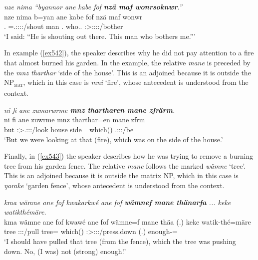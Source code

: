 \begin{exe}
	\ex \emph{nze nima ``byannor ane kabe fof \textbf{nzä maf wonrsoknwr}.''}\\
	\gll nze nima b=yan ane kabe fof nzä maf wonwr\\
	\Fsg.{\Erg} {\Quot} \Med=\Tsg.\Masc:\Sbj:\Nonpast:\Ipfv:\Venit/shout {\Dem} man {\Emph} \Fsg.{\Abs} who.\Sg.{\Erg} \Stsg:\Sbj>\Fsg:\Obj:\Nonpast:\Ipfv:\Venit/bother\\
	\trans `I said: ``He is shouting out there. This man who bothers me.'''\\
	\label{ex541}
\end{exe}

In example (\ref{ex542}), the speaker describes why he did not pay attention to a fire that almost burned his garden. In the example, the relative  \emph{mane} is preceded by the  \emph{mnz tharthar} `side of the house'. This is an adjoined  because it is outside the NP\textsubscript{\textsc{mat}}, which in this case is \emph{mni} `fire', whose antecedent is understood from the context.

\begin{exe}
	\ex \emph{ni fi ane zumarwrme \textbf{mnz thartharen mane zfrärm}.}\\
	\gll ni fi ane zuwrme mnz tharthar=en mane zfrm\\
	{\Fnsg} but {\Dem} \Fpl:\Sbj>\Tsg.\F:\Obj:\Pst:\Dur/look house side={\Loc} which(\Abs) \Tsg.\F:\Sbj:\Pst:\Dur/be\\
	\trans `But we were looking at that (fire), which was on the side of the house.'\\
	\label{ex542}
\end{exe}

Finally, in (\ref{ex543}) the speaker describes how he was trying to remove a burning tree from his garden fence. The relative  \emph{mane} follows the  marked \emph{wämne} `tree'. This is an adjoined  because it is outside the matrix NP, which in this case is \emph{ŋarake} `garden fence', whose antecedent is understood from the context.

\begin{exe}
	\ex \emph{kma wämne ane fof kwakarkwé ane fof \textbf{wämnef mane thänarfa} ... keke watikthémäre.}\\
	\gll kma wämne ane fof kwawé ane fof wämne=f mane thäa (.) keke watik-thé=märe\\
	{\Pot} tree {\Dem} {\Emph} \Fsg:\Sbj:\Rpst:\Ipfv/pull {\Dem} {\Emph} tree={\Erg} which(\Abs) \Sg:\Sbj>\Stpl:\Obj:\Pst:\Ipfv/press.down (.) {\Neg} enough-\Adlzr={\Priv}\\
	\trans `I should have pulled that tree (from the fence), which the tree was pushing down. No, (I was) not (strong) enough!'
	\label{ex543}
\end{exe}

